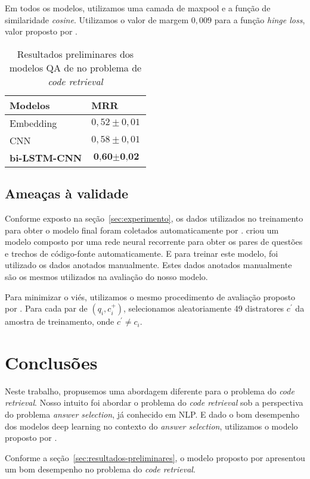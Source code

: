 \documentclass[12pt]{article}
\begin{document}
Em todos os modelos, utilizamos uma camada de maxpool e a função de similaridade \textit{cosine}. Utilizamos o valor de margem $0,009$ para a função \textit{hinge loss}, valor proposto por \cite{feng-answer-selection-2015}.


\begin{table}[h]
\centering
\begin{tabular}{ |p{3cm}|p{3cm}|  }
 \hline
 \textbf{Modelos} & \textbf{MRR}\\
 \hline
 Embedding & $0,52 \pm 0,01$\\
 \hline
 CNN & $0,58 \pm 0,01 $ \\
 \hline
 \textbf{bi-LSTM-CNN} & $\textbf{0,60} \pm \textbf{0,02}$\\
 \hline
\end{tabular}
\caption{Resultados preliminares dos modelos QA de \cite{tan-lstm-qa} no problema de \textit{code retrieval}}
\label{table:resultados-preliminares}
\end{table}

\subsection{Ameaças à validade}

Conforme exposto na seção~\ref{sec:experimento}, os dados utilizados no treinamento para obter o modelo final foram coletados automaticamente por \cite{Yao-staqc:2018}. \cite{Yao-staqc:2018} criou um modelo composto por uma rede neural recorrente para obter os pares de questões e trechos de código-fonte automaticamente. E para treinar este modelo, foi utilizado os dados anotados manualmente. Estes dados anotados manualmente são os mesmos utilizados na avaliação do nosso modelo. 

Para minimizar o viés, utilizamos o mesmo procedimento de avaliação proposto por \cite{iyer-etal-2016-summarizing}. Para cada par de $(q_{i}, c_{i}^{+})$, selecionamos aleatoriamente 49 distratores $c^{'}$ da amostra de treinamento, onde $c^{'} \neq c_{i}$. 

\section{Conclusões}

Neste trabalho, propusemos uma abordagem diferente para o problema do \textit{code retrieval}. Nosso intuito foi abordar o problema do \textit{code retrieval} sob a perspectiva do problema \textit{answer selection}, já conhecido em NLP. E dado o bom desempenho dos modelos deep learning no contexto do \textit{answer selection}, utilizamos o modelo proposto por \cite{tan-lstm-qa}.

Conforme a seção~\ref{sec:resultados-preliminares}, o modelo proposto por \cite{tan-lstm-qa} apresentou um bom desempenho no problema do \textit{code retrieval}. 





\end{document}
